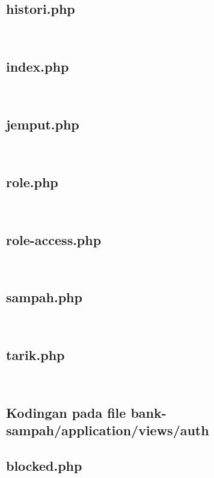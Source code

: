 \subsection{histori.php}
\hfill\\

\subsection{index.php}
\hfill\\

\subsection{jemput.php}
\hfill\\

\subsection{role.php}
\hfill\\

\subsection{role-access.php}
\hfill\\

\subsection{sampah.php}
\hfill\\

\subsection{tarik.php}
\hfill\\


\subsection{Kodingan pada file bank-sampah/application/views/auth}
\subsection{blocked.php}
\hfill\\

